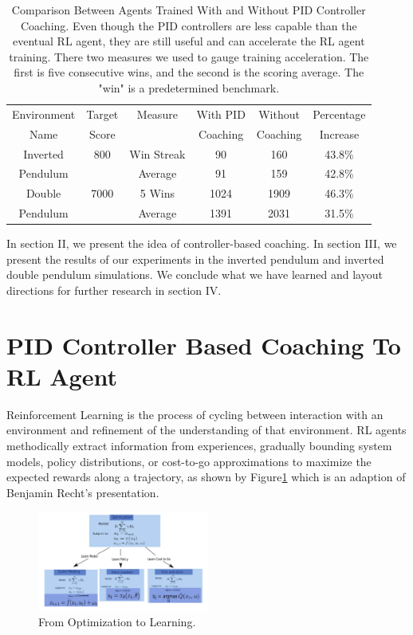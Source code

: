 \documentclass[journal]{IEEEtran}
\begin{document}
\begin{table}
\scriptsize
\caption{Comparison Between Agents Trained With and Without PID Controller Coaching. Even though the PID controllers are less capable than the eventual RL agent, they are still useful and can accelerate the RL agent training. There two measures we used to gauge training acceleration. The first is five consecutive wins, and the second is the scoring average. The "win" is a predetermined benchmark. }
\label{episode_compare}
\centering
\begin{tabular}{ cccccc }
\rowcolor{airforceblue}

Environment & Target & Measure  &  With PID  & Without  & Percentage\\
\rowcolor{airforceblue}

   Name     & Score  &              & Coaching  & Coaching  & Increase \\
Inverted & 800& Win Streak & 90 & 160&  43.8\% \\
Pendulum & &Average  & 91 &  159&  42.8\%\\
\rowcolor{beaublue}
Double & 7000& 5 Wins & 1024 & 1909&  46.3\%\\
\rowcolor{beaublue}
Pendulum & &Average & 1391 &  2031&  31.5\%\\

\end{tabular}
\end{table}

In section II, we present the idea of controller-based coaching. In section III, we present the results of our experiments in the inverted pendulum and inverted double pendulum simulations. We conclude what we have learned and layout directions for further research in section IV.

\section{PID Controller Based Coaching To RL Agent}

Reinforcement Learning is the process of cycling between interaction with an environment and refinement of the understanding of that environment. RL agents methodically extract information from experiences, gradually bounding system models, policy distributions, or cost-to-go approximations to maximize the expected rewards along a trajectory, as shown by Figure\ref{fig:rl} which is an adaption of Benjamin Recht's presentation\cite{Recht2018ATO}. 

\begin{figure}[H]
    \centering
    \includegraphics[width=0.5\textwidth]{Control.png}
    \caption{From Optimization to Learning.}
    \label{fig:rl}
\end{figure} 
\end{document}
